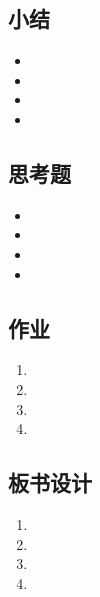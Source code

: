 \documentclass{article}
\begin{document}
\begin{CJK}{UTF8}{gkai}
\subsection{}
\subsection{}

\subsection{小结}
\begin{itemize}
\item
\item
\item
\item 
\end{itemize}

\subsection{思考题}
\begin{itemize}
\item
\item
\item
\item 
\end{itemize}

\subsection{作业}
\begin{enumerate}
\item 
\item
\item
\item
\end{enumerate}

\subsection{板书设计}
\begin{enumerate}
\item 
\item
\item
\item
\end{enumerate}



\end{CJK}
\end{document}
